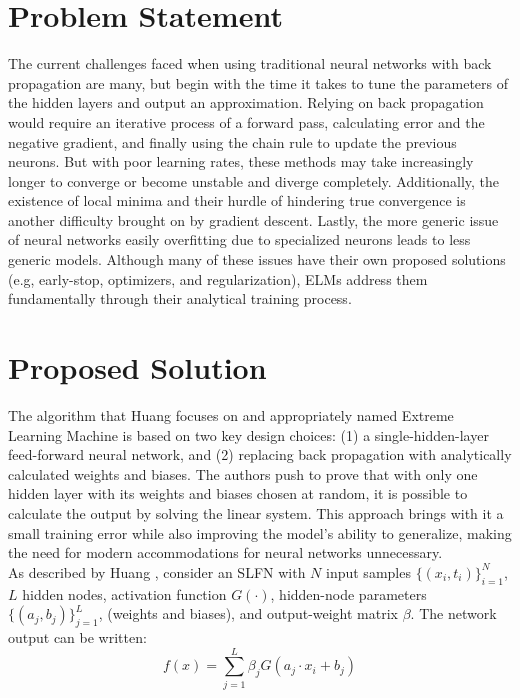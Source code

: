 \documentclass[12pt]{article}
\begin{document}
\section{Problem Statement}
The current challenges faced when using traditional neural networks with back propagation are many, but begin with the time it takes to tune the parameters of the hidden layers and output an approximation. Relying on back propagation would require an iterative process of a forward pass, calculating error and the negative gradient, and finally using the chain rule to update the previous neurons. But with poor learning rates, these methods may take increasingly longer to converge or become unstable and diverge completely. Additionally, the existence of local minima and their hurdle of hindering true convergence is another difficulty brought on by gradient descent. Lastly, the more generic issue of neural networks easily overfitting due to specialized neurons leads to less generic models. Although many of these issues have their own proposed solutions (e.g, early-stop, optimizers, and regularization), ELMs address them fundamentally through their analytical training process.

\section{Proposed Solution}
The algorithm that Huang \cite{huang2006extreme} focuses on and appropriately named Extreme Learning Machine is based on two key design choices: (1) a single-hidden-layer feed-forward neural network, and (2) replacing back propagation with analytically calculated weights and biases. The authors push to prove that with only one hidden layer with its weights and biases chosen at random, it is possible to calculate the output by solving the linear system. This approach brings with it a small training error while also improving the model's ability to generalize, making the need for modern accommodations for neural networks unnecessary. \\

As described by Huang \cite{huang2006extreme}, consider an SLFN with $N$ input samples $\{(x_i, t_i)\}_{i=1}^N$, $L$ hidden nodes, activation function $G(\cdot)$, hidden-node parameters $\{(a_j, b_j)\}_{j=1}^L$, (weights and biases), and output-weight matrix $\beta$. The network output can be written:
\begin{equation}
f(x) = \sum_{j=1}^{L} \beta_j G(a_j \cdot x_i + b_j)
\end{equation}
\end{document}
